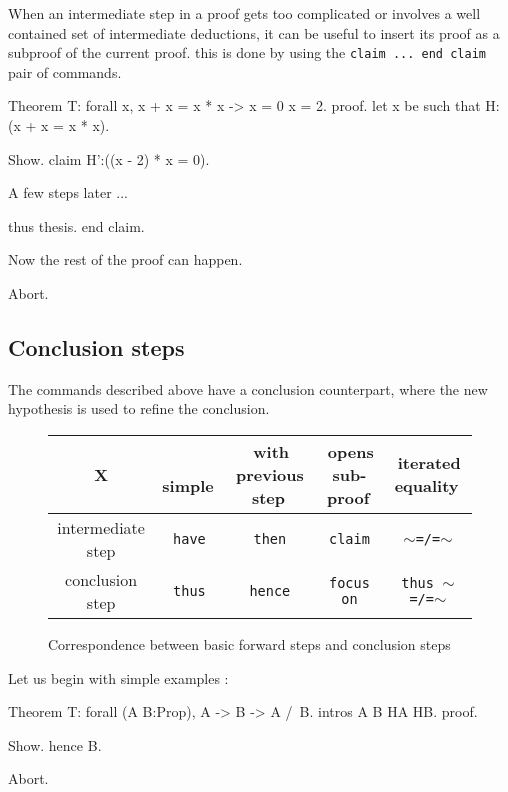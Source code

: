When an intermediate step in a proof gets too complicated or involves a well contained set of intermediate deductions, it can be useful to insert its proof as a subproof of the current proof. this is done by using the {\tt claim ... end claim} pair of commands. 

\begin{coq_eval}
Theorem T: forall x, x + x = x * x -> x = 0 \/ x = 2.
proof.
let x be such that H:(x + x = x * x).
\end{coq_eval} 
\begin{coq_example}
Show.
claim H':((x - 2) * x = 0).
\end{coq_example}

A few steps later ...

\begin{coq_example}
thus thesis. 
end claim.
\end{coq_example}

Now the rest of the proof can happen.

\begin{coq_eval}
Abort.
\end{coq_eval}

\subsection{Conclusion steps}

The commands described above have a conclusion counterpart, where the
new hypothesis is used to refine the conclusion.

\begin{figure}[b]
 \centering
\begin{tabular}{c|c|c|c|c|}
        X       & \,simple\, & \,with previous step\, & 
               \,opens sub-proof\, & \,iterated equality\, \\
\hline
intermediate step & {\tt have} & {\tt then} & 
               {\tt claim} & {\tt $\sim$=/=$\sim$}\\ 
conclusion step & {\tt thus} & {\tt hence} & 
                {\tt focus on} & {\tt thus $\sim$=/=$\sim$}\\ 
\hline
\end{tabular}
\caption{Correspondence between basic forward steps and conclusion steps}
\end{figure}

Let us begin with simple examples :

\begin{coq_eval}
Theorem T: forall (A B:Prop), A -> B -> A /\ B.
intros A B HA HB.
proof.
\end{coq_eval} 
\begin{coq_example}
Show.
hence B.
\end{coq_example}
\begin{coq_eval}
Abort.
\end{coq_eval}


